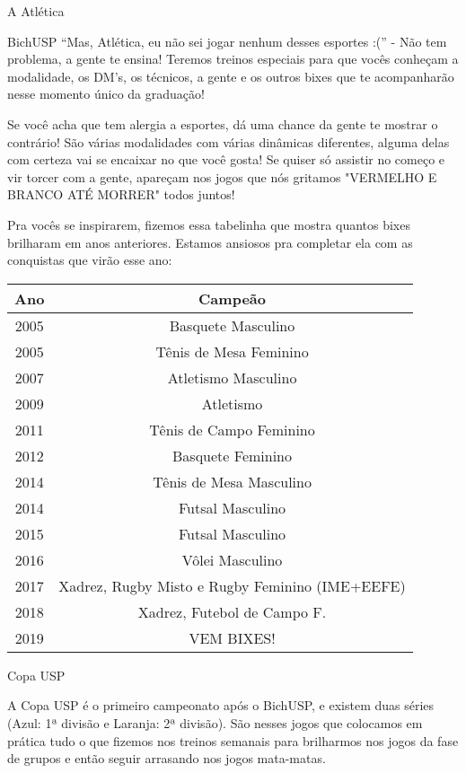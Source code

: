 \begin{secao}{A Atlética}
\begin{subsecao}{BichUSP}
``Mas, Atlética, eu não sei jogar nenhum desses esportes :('' - Não tem
problema, a gente te ensina! Teremos treinos especiais para que vocês conheçam
a modalidade, os DM’s, os técnicos, a gente e os outros bixes que te
acompanharão nesse momento único da graduação!

Se você acha que tem alergia a esportes, dá uma chance da gente te mostrar o
contrário! São várias modalidades com várias dinâmicas diferentes, alguma delas
com certeza vai se encaixar no que você gosta! Se quiser só assistir no começo
e vir torcer com a gente, apareçam nos jogos que nós gritamos "VERMELHO E
BRANCO ATÉ MORRER" todos juntos!

Pra vocês se inspirarem, fizemos essa tabelinha que mostra quantos bixes
brilharam em anos anteriores. Estamos ansiosos pra completar ela com as
conquistas que virão esse ano:

\begin{center}
  \begin{tabular}{c|c}
    \hline
    Ano & Campeão\\
    \hline
    2005 & Basquete Masculino \\
    2005 & Tênis de Mesa Feminino \\
    2007 & Atletismo Masculino\\
    2009 & Atletismo\\
    2011 & Tênis de Campo Feminino\\
    2012 & Basquete Feminino\\
    2014 & Tênis de Mesa Masculino\\
    2014 & Futsal Masculino\\
    2015 & Futsal Masculino\\
    2016 & Vôlei Masculino\\
    2017 & Xadrez, Rugby Misto e Rugby Feminino (IME+EEFE)\\
    2018 & Xadrez, Futebol de Campo F.\\
    2019 & VEM BIXES!\\
    \hline
  \end{tabular}
\end{center}

\end{subsecao}
\begin{subsecao}{Copa USP}

A Copa USP é o primeiro campeonato após o BichUSP, e existem duas séries (Azul:
1ª divisão e Laranja: 2ª divisão). São nesses jogos que colocamos em prática
tudo o que fizemos nos treinos semanais para brilharmos nos jogos da fase de
grupos e então seguir arrasando nos jogos mata-matas.


\end{subsecao}
\end{secao}
